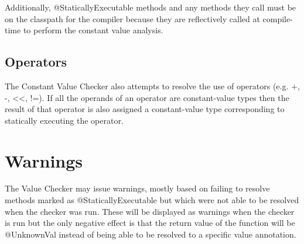 Additionally, @StaticallyExecutable methods and any methods they call must be on
the classpath for the compiler because they are reflectively called at
compile-time to perform the constant value analysis.

\subsection{Operators}
The Constant Value Checker also attempts to resolve the use of
operators (e.g. +, -, <<, !=). If all the operands of an operator are
constant-value types then the result of that operator is also
assigned a constant-value type corresponding to statically executing
the operator. 

\section{Warnings}
The Value Checker may issue warnings, mostly based on failing to
resolve methods marked as @StaticallyExecutable but which were not able to be
resolved when the checker was run. These will be displayed as warnings when
the checker is run but the only negative effect is that the return
value of the function will be @UnknownVal instead of being able to be
resolved to a specific value annotation.


